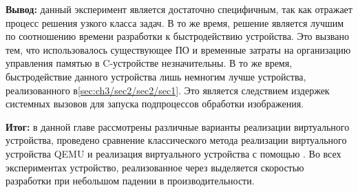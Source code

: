 \textbf{Вывод:} данный эксперимент является достаточно специфичным, так как отражает процесс
решения узкого класса задач. В то же время, решение является лучшим по соотношению
времени разработки к быстродействию устройства.
Это вызвано тем, что использовалось существующее ПО и временные затраты на
организацию управления памятью в C-устройстве незначительны.
В то же время, быстродействие данного устройства лишь немногим лучше устройства,
реализованного в\cref{sec:ch3/sec2/sec2/sec1}. Это является следствием издержек
системных вызовов для запуска подпроцессов обработки изображения.


\textbf{Итог:} в данной главе рассмотрены различные варианты реализации виртуального
устройства, проведено сравнение классического метода реализации виртуального устройства
QEMU и реализация виртуального устройства с помощью {\mylanguage}.
Во всех экспериментах устройство, реализованное через {\mylanguage} выделяется
скоростью разработки при небольшом падении в производительности.
